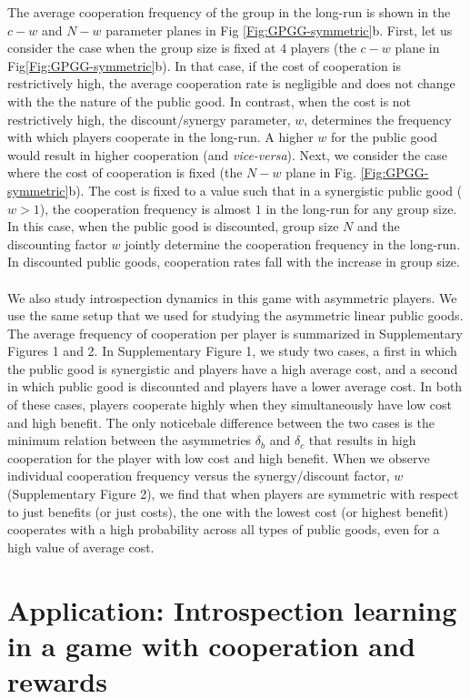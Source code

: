 \documentclass[11pt]{article}
\theoremstyle{plainCl1}
\theoremstyle{plainCl2}
\begin{document}
\noindent The average cooperation frequency of the group in the long-run is shown in the $c-w$ and $N-w$ parameter planes in Fig \ref{Fig:GPGG-symmetric}b. First, let us consider the case when the group size is fixed at $4$ players (the $c-w$ plane in Fig\ref{Fig:GPGG-symmetric}b). In that case, if the cost of cooperation is restrictively high, the average cooperation rate is negligible and does not change with the the nature of the public good. In contrast, when the cost is not restrictively high, the discount/synergy parameter, $w$, determines the frequency with which players cooperate in the long-run. A higher $w$ for the public good would result in higher cooperation (and \emph{vice-versa}). Next, we consider the case where the cost of cooperation is fixed (the $N-w$ plane in Fig. \ref{Fig:GPGG-symmetric}b). The cost is fixed to a value such that in a synergistic public good ($w > 1$), the cooperation frequency is almost $1$ in the long-run for any group size. In this case, when the public good is discounted, group size $N$ and the discounting factor $w$ jointly determine the cooperation frequency in the long-run. In discounted public goods, cooperation rates fall with the increase in group size.\\ \\
\noindent 
We also study introspection dynamics in this game with asymmetric players. We use the same setup that we used for studying the asymmetric linear public goods. The average frequency of cooperation per player is summarized in Supplementary Figures 1 and 2. In Supplementary Figure 1, we study two cases, a first in which the public good is synergistic and players have a high average cost, and a second in which public good is discounted and players have a lower average cost. In both of these cases, players cooperate highly when they simultaneously have low cost and high benefit. The only noticebale difference between the two cases is the minimum relation between the asymmetries $\delta_b$ and $\delta_c$ that results in high cooperation for the player with low cost and high benefit. When we observe individual cooperation frequency versus the synergy/discount factor, $w$ (Supplementary Figure 2), we find that when players are symmetric with respect to just benefits (or just costs), the one with the lowest cost (or highest benefit) cooperates with a high probability across all types of public goods, even for a high value of average cost.

\section{Application: Introspection learning in a game with cooperation and rewards}
\end{document}
